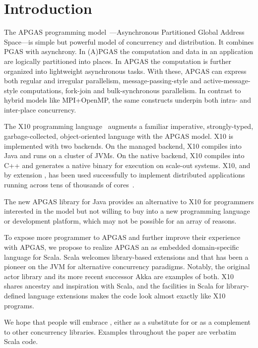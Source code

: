 \section{Introduction}

The APGAS programming model~\cite{amp10}---Asynchronous Partitioned Global Address Space---is simple but powerful
model of concurrency and distribution. It combines PGAS with asynchrony.
In (A)PGAS the computation and data in an application are logically partitioned into places.
In APGAS the computation is further organized into lightweight asynchronous tasks.
With these, APGAS can express both
regular and irregular parallelism, message-passing-style and
active-message-style computations, fork-join and bulk-synchronous
parallelism.  In contrast to hybrid models like MPI+OpenMP, the same
constructs underpin both intra- and inter-place concurrency.

The X10 programming language~\cite{oopsla05} augments a familiar imperative, strongly-typed, garbage-collected, object-oriented language with the APGAS model. X10 is implemented with two backends. On the managed backend, X10
compiles into Java and runs on a cluster of JVMs. On the native backend, X10 compiles into C++ and generates a native binary
for execution on scale-out systems.
X10, and by extension
\apgas, has been used successfully to implement distributed applications
running across tens of thousands of cores~\cite{TardieuETAL14X10ApgasAtPetascale}.

The new APGAS library for Java \cite{APGASJava} provides an alternative to X10 for programmers interested in the \apgas model but not willing to buy into a new programming language or development platform, which may not be possible for an array
of reasons.

To expose more programmer to APGAS and further improve their experience with APGAS, we propose to realize APGAS an as embedded domain-specific language for Scala. 
Scala welcomes library-based extensions and that has been a pioneer on
the JVM for alternative concurrency paradigms. Notably, the original actor
library and its more recent successor Akka are examples of both. 
X10 shares ancestry and inspiration with Scala, and the
facilities in Scala for library-defined language extensions makes the code look
almost exactly like X10 programs.

We hope that people will embrace \apgas, either as a substitute for or as a
complement to other concurrency libraries. Examples throughout the paper are
verbatim Scala \apgas code. 

